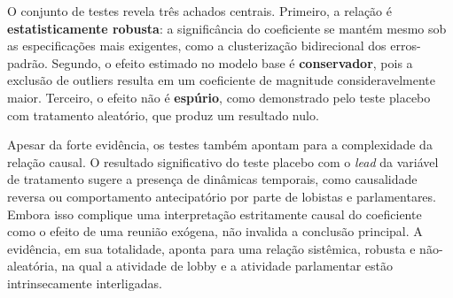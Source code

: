 O conjunto de testes revela três achados centrais. Primeiro, a relação é \textbf{estatisticamente robusta}: a significância do coeficiente se mantém mesmo sob as especificações mais exigentes, como a clusterização bidirecional dos erros-padrão. Segundo, o efeito estimado no modelo base é \textbf{conservador}, pois a exclusão de outliers resulta em um coeficiente de magnitude consideravelmente maior. Terceiro, o efeito não é \textbf{espúrio}, como demonstrado pelo teste placebo com tratamento aleatório, que produz um resultado nulo.

Apesar da forte evidência, os testes também apontam para a complexidade da relação causal. O resultado significativo do teste placebo com o \textit{lead} da variável de tratamento sugere a presença de dinâmicas temporais, como causalidade reversa ou comportamento antecipatório por parte de lobistas e parlamentares. Embora isso complique uma interpretação estritamente causal do coeficiente como o efeito de uma reunião exógena, não invalida a conclusão principal. A evidência, em sua totalidade, aponta para uma relação sistêmica, robusta e não-aleatória, na qual a atividade de lobby e a atividade parlamentar estão intrinsecamente interligadas.






